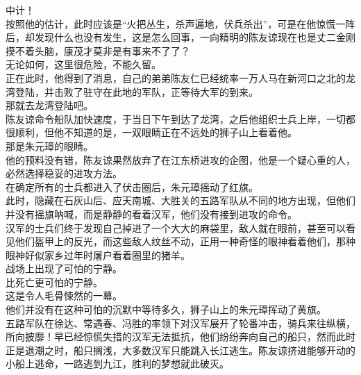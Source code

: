 \begin{multicols}{\theparacolNo}
中计！\\

按照他的估计，此时应该是“火把丛生，杀声遍地，伏兵杀出”，可是在他惊慌一阵后，却发现什么也没有发生，这是怎么回事，一向精明的陈友谅现在也是丈二金刚摸不着头脑，康茂才莫非是有事来不了了？\\

无论如何，这里很危险，不能久留。\\

正在此时，他得到了消息，自己的弟弟陈友仁已经统率一万人马在新河口之北的龙湾登陆，并击败了驻守在此地的军队，正等待大军的到来。\\

那就去龙湾登陆吧。\\

陈友谅命令船队加快速度，于当日下午到达了龙湾，之后他组织士兵上岸，一切都很顺利，但他不知道的是，一双眼睛正在不远处的狮子山上看着他。\\

那是朱元璋的眼睛。\\

他的预料没有错，陈友谅果然放弃了在江东桥进攻的企图，他是一个疑心重的人，必然选择稳妥的进攻方法。\\

在确定所有的士兵都进入了伏击圈后，朱元璋摇动了红旗。\\

此时，隐藏在石灰山后、应天南城、大胜关的五路军队从不同的地方出现，但他们并没有摇旗呐喊，而是静静的看着汉军，他们没有接到进攻的命令。\\

汉军的士兵们终于发现自己掉进了一个大大的麻袋里，敌人就在眼前，甚至可以看见他们盔甲上的反光，而这些敌人纹丝不动，正用一种奇怪的眼神看着他们，那种眼神好似家乡过年时屠户看着圈里的猪羊。\\

战场上出现了可怕的宁静。\\

比死亡更可怕的宁静。\\

这是令人毛骨悚然的一幕。\\

他们并没有在这种可怕的沉默中等待多久，狮子山上的朱元璋挥动了黄旗。\\

五路军队在徐达、常遇春、冯胜的率领下对汉军展开了轮番冲击，骑兵来往纵横，所向披靡！早已经惊慌失措的汉军无法抵抗，他们纷纷奔向自己的船只，然而此时正是退潮之时，船只搁浅，大多数汉军只能跳入长江逃生。陈友谅挤进能够开动的小船上逃命，一路逃到九江，胜利的梦想就此破灭。\\


\end{multicols}
